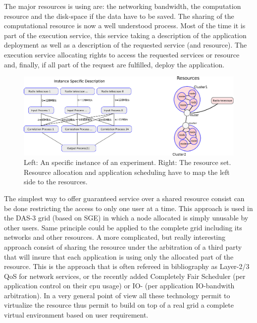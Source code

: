 The major resources \scarie is using are: the networking bandwidth, 
the computation resource and the disk-space if the data have 
to be saved. The sharing of the computational resource is now
a well understood process. Most of the time it is part of the 
execution service, this service taking a description of the 
application deployment as well as a description of the 
requested service (and resource). The execution service 
allocating rights to access the requested services or 
resource and, finally, if all part of the request 
are fulfilled, deploy the application. 
\begin{figure}
  \centering
  \includegraphics[width=\textwidth]
    {img/mapping.eps}
    \caption{Left: An specific instance of an experiment. Right: The resource set. Resource 
allocation and application scheduling have to map the left side to the resources. }
  \label{fig:mapping}
\end{figure}
The simplest way to offer guaranteed service over a shared resource consist
can be done restricting the access to only one user at a time. This approach is 
used in the DAS-3 grid (based on SGE) in which a node allocated is simply unusable 
by other users. Same principle could be applied to the complete grid including its 
networks and other resources. A more complicated, but really interesting approach 
consist of sharing the resource under the arbitration of a third party that will 
insure that each application is using only the allocated part of the resource. This 
is the approach that is often refereed in bibliography as Layer-2/3 QoS for 
network services, or the recently added Completely Fair Scheduler (per application 
control on their cpu usage) or IO- (per application IO-bandwith arbitration). In a 
very general point of view all these technology permit to virtualize the resource thus 
permit to build on top of a real grid a complete virtual environment based on user 
requirement.

